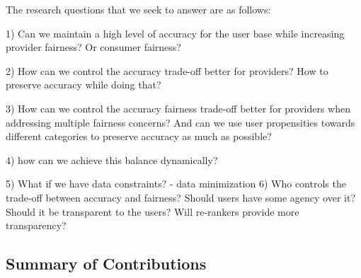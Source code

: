 
The research questions that we seek to answer are as follows:

1) Can we maintain a high level of accuracy for the user base while increasing provider fairness? Or consumer fairness?

2) How can we control the accuracy trade-off better for providers? How to preserve accuracy while doing that? 

3) How can we control the accuracy fairness trade-off better for providers when addressing multiple fairness concerns? And can we use user propensities towards different categories to preserve accuracy as much as possible?

4) how can we achieve this balance dynamically?

5) What if we have data constraints? - data minimization
6) Who controls the trade-off between accuracy and fairness? Should users have some agency over it? Should it be transparent to the users? Will re-rankers provide more transparency?




\subsection{Summary of Contributions}

